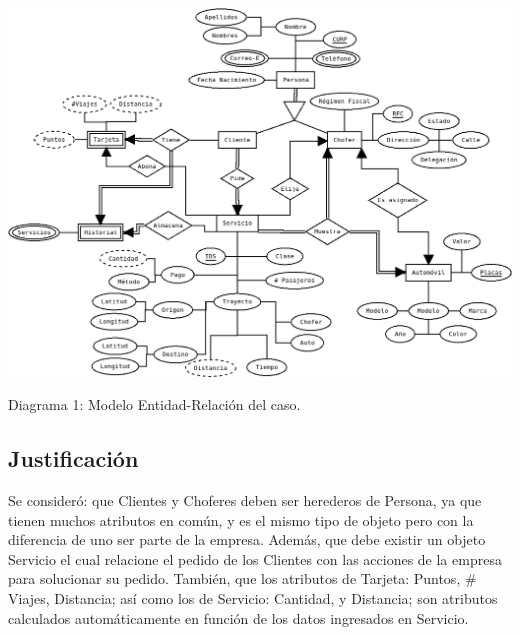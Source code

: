 \documentclass{article}
\begin{document}
       \includegraphics[width=14.7cm]{ER.png}\\
       \centerline{Diagrama 1: Modelo Entidad-Relación del caso.}

       \subsection{Justificación}

       { 
       Se consideró: que Clientes y Choferes deben ser herederos de Persona, ya que tienen muchos
       atributos en común, y es el mismo tipo de objeto pero con la diferencia de uno ser parte de
       la empresa. Además, que debe existir un objeto Servicio el cual relacione el pedido de los
       Clientes con las acciones de la empresa para solucionar su pedido. También, que los atributos
       de Tarjeta: Puntos, $\#$Viajes, Distancia; así como los de Servicio:
       Cantidad, y Distancia; son atributos calculados automáticamente en función de los datos
       ingresados en Servicio.
       }\\
\end{document}

